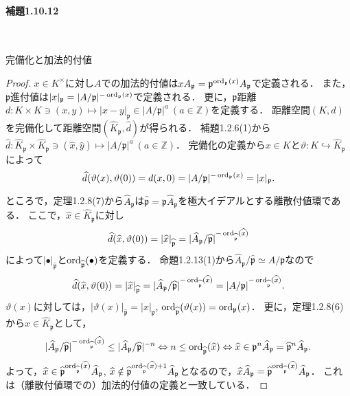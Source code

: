\paragraph{補題1.10.12}~
\begin{screen}
  完備化と加法的付値
\end{screen}
\begin{proof}
  $x\in K^\times$に対し$A$での加法的付値は$xA_\mathfrak{p}=\mathfrak{p}^{\operatorname{ord}_\mathfrak{p}(x)}A_\mathfrak{p}$で定義される．
  また，$\mathfrak{p}$進付値は$\lvert x\rvert_\mathfrak{p}=\lvert A/\mathfrak{p}\rvert^{-\operatorname{ord}_\mathfrak{p}(x)}$で定義される．
  更に，$\mathfrak{p}$距離$d\colon K\times K\ni(x,y)\mapsto\lvert x-y\rvert_\mathfrak{p}\in\lvert A/\mathfrak{p}\rvert^a\ (a\in\mathbb{Z})$を定義する．
  距離空間$(K,d)$を完備化して距離空間$(\widehat{K}_\mathfrak{p},\widehat{d})$が得られる．
  補題1.2.6(1)から$\widehat{d}\colon\widehat{K}_\mathfrak{p}\times\widehat{K}_\mathfrak{p}\ni(\widehat{x},\widehat{y})\mapsto\lvert A/\mathfrak{p}\rvert^a\ (a\in\mathbb{Z})$．
  完備化の定義から$x\in K$と$\vartheta\colon K\hookrightarrow\widehat{K}_\mathfrak{p}$によって
  \[\widehat{d}(\vartheta(x),\vartheta(0))=d(x,0)=\lvert A/\mathfrak{p}\rvert^{-\operatorname{ord}_\mathfrak{p}(x)}=\lvert x\rvert_\mathfrak{p}.\]

  ところで，定理1.2.8(7)から$\widehat{A}_\mathfrak{p}$は$\widehat{\mathfrak{p}}=\mathfrak{p}\widehat{A}_\mathfrak{p}$を極大イデアルとする離散付値環である．
  ここで，$\widehat{x}\in\widehat{K}_\mathfrak{p}$に対し
  \[\widehat{d}(\widehat{x},\vartheta(0))=\lvert\widehat{x}\rvert_{\widehat{\mathfrak{p}}}=\lvert\widehat{A}_\mathfrak{p}/\widehat{\mathfrak{p}}\rvert^{-\operatorname{ord}_{\widehat{\mathfrak{p}}}(\widehat{x})}\]
  によって$\lvert\bullet\rvert_{\widehat{\mathfrak{p}}}$と$\operatorname{ord}_{\widehat{\mathfrak{p}}}(\bullet)$を定義する．
  命題1.2.13(1)から$\widehat{A}_\mathfrak{p}/\widehat{\mathfrak{p}}\simeq A/\mathfrak{p}$なので
  \[\widehat{d}(\widehat{x},\vartheta(0))=\lvert\widehat{x}\rvert_{\widehat{\mathfrak{p}}}=\lvert\widehat{A}_\mathfrak{p}/\widehat{\mathfrak{p}}\rvert^{-\operatorname{ord}_{\widehat{\mathfrak{p}}}(\widehat{x})}=\lvert A/\mathfrak{p}\rvert^{-\operatorname{ord}_{\widehat{\mathfrak{p}}}(\widehat{x})}.\]
  $\vartheta(x)$に対しては，$\lvert\vartheta(x)\rvert_{\widehat{\mathfrak{p}}}=\lvert x\rvert_\mathfrak{p}$, $\operatorname{ord}_{\widehat{\mathfrak{p}}}(\vartheta(x))=\operatorname{ord}_\mathfrak{p}(x)$．
  更に，定理1.2.8(6)から$\widehat{x}\in\widehat{K}_\mathfrak{p}$として，
  \[\lvert\widehat{A}_\mathfrak{p}/\widehat{\mathfrak{p}}\rvert^{-\operatorname{ord}_{\widehat{\mathfrak{p}}}(\widehat{x})}\leq\lvert\widehat{A}_\mathfrak{p}/\widehat{\mathfrak{p}}\rvert^{-n}\Leftrightarrow n\leq\operatorname{ord}_{\widehat{\mathfrak{p}}}(\widehat{x})\Leftrightarrow\widehat{x}\in\mathfrak{p}^n\widehat{A}_\mathfrak{p}=\widehat{\mathfrak{p}}^n\widehat{A}_\mathfrak{p}.\]
  よって，$\widehat{x}\in\widehat{\mathfrak{p}}^{\operatorname{ord}_{\widehat{\mathfrak{p}}}(\widehat{x})}\widehat{A}_\mathfrak{p}$, $\widehat{x}\notin\widehat{\mathfrak{p}}^{\operatorname{ord}_{\widehat{\mathfrak{p}}}(\widehat{x})+1}\widehat{A}_\mathfrak{p}$となるので，$\widehat{x}\widehat{A}_\mathfrak{p}=\widehat{\mathfrak{p}}^{\operatorname{ord}_{\widehat{\mathfrak{p}}}(\widehat{x})}\widehat{A}_\mathfrak{p}$．
  これは（離散付値環での）加法的付値の定義と一致している．


\end{proof}
